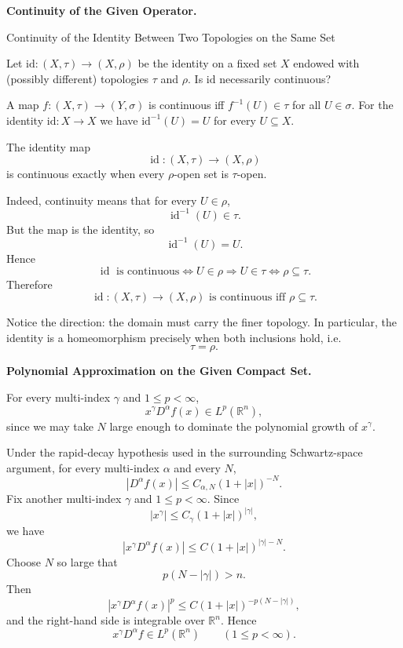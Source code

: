 \begin{problem}[CP-II-0416]
\label{prob:cp-ii-0416}
\textbf{Continuity of the Given Operator.}

\hspace*{1.5em}Continuity of the Identity Between Two Topologies on the Same Set

Let $\mathrm{id}:(X,\tau)\to (X,\rho)$ be the identity on a fixed set $X$ endowed with (possibly different) topologies $\tau$ and $\rho$. Is $\mathrm{id}$ necessarily continuous?

A map $f:(X,\tau)\to(Y,\sigma)$ is continuous iff $f^{-1}(U)\in\tau$ for all $U\in\sigma$.
For the identity $\mathrm{id}:X\to X$ we have $\mathrm{id}^{-1}(U)=U$ for every $U\subseteq X$.
\end{problem}

\begin{solution}
The identity map
\[
\operatorname{id}:(X,\tau)\to(X,\rho)
\]
is continuous exactly when every \(\rho\)-open set is \(\tau\)-open.

Indeed, continuity means that for every \(U\in\rho\),
\[
\operatorname{id}^{-1}(U)\in\tau.
\]
But the map is the identity, so
\[
\operatorname{id}^{-1}(U)=U.
\]
Hence
\[
\operatorname{id}\text{ is continuous}
\iff
U\in\rho\Longrightarrow U\in\tau
\iff
\rho\subseteq\tau.
\]
Therefore
\[
\boxed{
\operatorname{id}:(X,\tau)\to(X,\rho)
\text{ is continuous iff }\rho\subseteq\tau.
}
\]

Notice the direction: the domain must carry the finer topology. In particular, the
identity is a homeomorphism precisely when both inclusions hold, i.e.
\[
\tau=\rho.
\]
\end{solution}

\begin{problem}[CP-II-0418]
\label{prob:cp-ii-0418}
\textbf{Polynomial Approximation on the Given Compact Set.}

\hspace*{1.5em}For every multi-index $\gamma$ and $1\le p<\infty$,
	\[
	x^\gamma D^\alpha f(x)\in L^p(\mathbb{R}^n),
	\]
	since we may take $N$ large enough to dominate the polynomial
	growth of $x^\gamma$.
\end{problem}

\begin{solution}
Under the rapid-decay hypothesis used in the surrounding Schwartz-space argument, for every
multi-index \(\alpha\) and every \(N\),
\[
|D^\alpha f(x)|
\le
C_{\alpha,N}(1+|x|)^{-N}.
\]
Fix another multi-index \(\gamma\) and \(1\le p<\infty\). Since
\[
|x^\gamma|
\le
C_\gamma(1+|x|)^{|\gamma|},
\]
we have
\[
|x^\gamma D^\alpha f(x)|
\le
C(1+|x|)^{|\gamma|-N}.
\]
Choose \(N\) so large that
\[
p(N-|\gamma|)>n.
\]
Then
\[
|x^\gamma D^\alpha f(x)|^p
\le
C(1+|x|)^{-p(N-|\gamma|)},
\]
and the right-hand side is integrable over \(\mathbb R^n\). Hence
\[
\boxed{
x^\gamma D^\alpha f
\in
L^p(\mathbb R^n)
\qquad
(1\le p<\infty).
}
\]
\end{solution}


